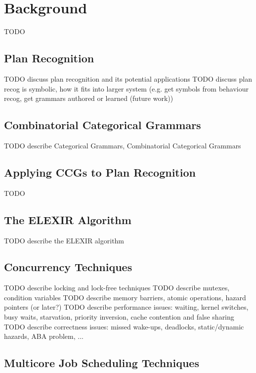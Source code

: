 \chapter{Background}

TODO

\section{Plan Recognition}

TODO discuss plan recognition and its potential applications
TODO discuss plan recog is symbolic, how it fits into larger system (e.g. get symbols from behaviour recog, get grammars authored or learned (future work))

\section{Combinatorial Categorical Grammars}

TODO describe Categorical Grammars, Combinatorial Categorical Grammars

\section{Applying CCGs to Plan Recognition}

TODO

\section{The ELEXIR Algorithm}

TODO describe the ELEXIR algorithm

\section{Concurrency Techniques}

TODO describe locking and lock-free techniques
TODO describe mutexes, condition variables
TODO describe memory barriers, atomic operations, hazard pointers (or later?)
TODO describe performance issues: waiting, kernel switches, busy waits, starvation, priority inversion, cache contention and false sharing
TODO describe correctness issues: missed wake-ups, deadlocks, static/dynamic hazards, ABA problem, ...

\section{Multicore Job Scheduling Techniques}

